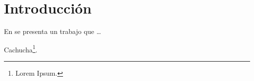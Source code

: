 \chapter*{Introducción}
\label{intro}

\blindtext

\blindtext

En \cite{article:mixfix} se presenta un trabajo que \ldots


\blindtext

\blinditemize

Cachucha\footnote{Lorem Ipsum.}.

\blindtext[4]
